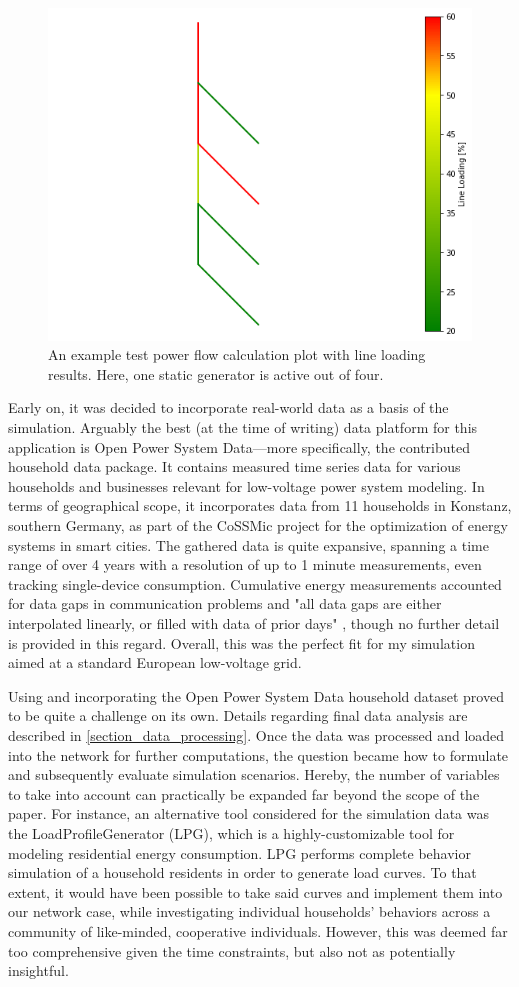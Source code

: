 \documentclass[a4paper,10pt]{report}
\begin{document}
\FloatBarrier
\begin{figure}[htpb]
		\centering
		\includegraphics[width=0.46\linewidth]{test_network}
		\caption{An example test power flow calculation plot with line loading results. Here, one static generator is active out of four.}
		\label{test_network}
	\end{figure}
\FloatBarrier

Early on, it was decided to incorporate real-world data as a basis of the simulation. Arguably the best (at the time of writing) data platform for this application is Open Power System Data---more specifically, the contributed household data package. It contains measured time series data for various households and businesses relevant for low-voltage power system modeling. In terms of geographical scope, it incorporates data from 11 households in Konstanz, southern Germany, as part of the CoSSMic project for the optimization of energy systems in smart cities. The gathered data is quite expansive, spanning a time range of over 4 years with a resolution of up to 1 minute measurements, even tracking single-device consumption. Cumulative energy measurements accounted for data gaps in communication problems and "all data gaps are either interpolated linearly, or filled with data of prior days" \cite{OpenPowerSystemData}, though no further detail is provided in this regard. Overall, this was the perfect fit for my simulation aimed at a standard European low-voltage grid.

Using and incorporating the Open Power System Data household dataset proved to be quite a challenge on its own. Details regarding final data analysis are described in \cref{section_data_processing}. Once the data was processed and loaded into the network for further computations, the question became how to formulate and subsequently evaluate simulation scenarios. Hereby, the number of variables to take into account can practically be expanded far beyond the scope of the paper. For instance, an alternative tool considered for the simulation data was the LoadProfileGenerator (LPG), which is a highly-customizable tool for modeling residential energy consumption. LPG performs complete behavior simulation of a household residents in order to generate load curves. To that extent, it would have been possible to take said curves and implement them into our network case, while investigating individual households' behaviors across a community of like-minded, cooperative individuals. However, this was deemed far too comprehensive given the time constraints, but also not as potentially insightful.
\end{document}

